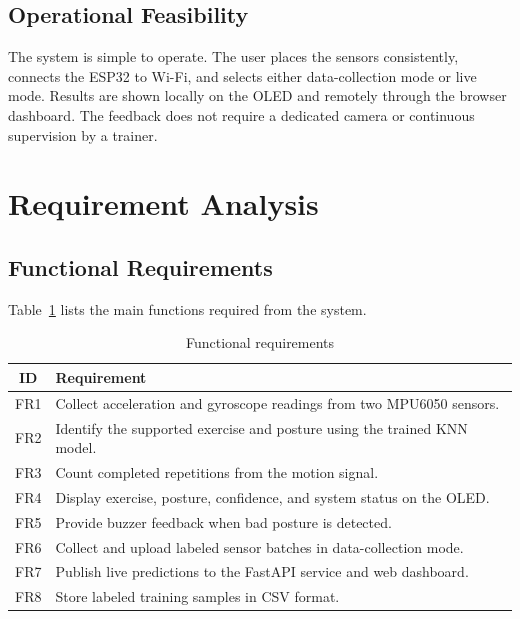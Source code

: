 \subsection{Operational Feasibility}
The system is simple to operate. The user places the sensors consistently, connects
the ESP32 to Wi-Fi, and selects either data-collection mode or live mode. Results are
shown locally on the OLED and remotely through the browser dashboard. The feedback
does not require a dedicated camera or continuous supervision by a trainer.

\section{Requirement Analysis}
\subsection{Functional Requirements}
Table~\ref{tab:functional-requirements} lists the main functions required from the
system.
\begin{table}[H]
	\centering
	\caption{Functional requirements}
	\label{tab:functional-requirements}
	\begin{tabular}{|c|p{}|}
		\hline
		\textbf{ID} & \textbf{Requirement} \\ \hline
		FR1 & Collect acceleration and gyroscope readings from two MPU6050 sensors. \\ \hline
		FR2 & Identify the supported exercise and posture using the trained KNN model. \\ \hline
		FR3 & Count completed repetitions from the motion signal. \\ \hline
		FR4 & Display exercise, posture, confidence, and system status on the OLED. \\ \hline
		FR5 & Provide buzzer feedback when bad posture is detected. \\ \hline
		FR6 & Collect and upload labeled sensor batches in data-collection mode. \\ \hline
		FR7 & Publish live predictions to the FastAPI service and web dashboard. \\ \hline
		FR8 & Store labeled training samples in CSV format. \\ \hline
	\end{tabular}
\end{table}

